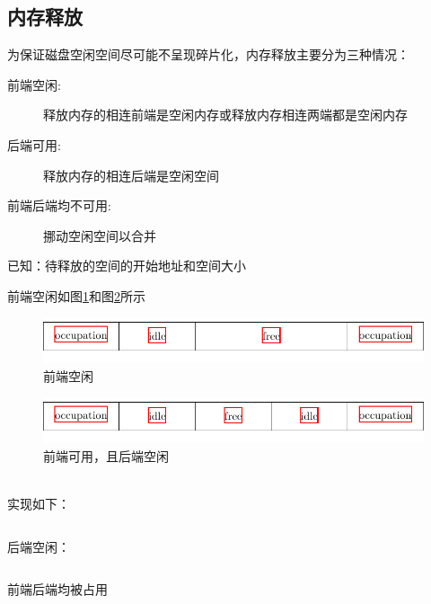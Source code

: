 \documentclass{swfcthesis}
\begin{document}
		\begin{listing}[H]
			\inputminted[tabsize=2, firstline=68, lastline=80,
			linenos=true]{c}{../ZOS/src/kernel/memory.c}
		\end{listing}
		
		\subsection{内存释放}
		为保证磁盘空闲空间尽可能不呈现碎片化，内存释放主要分为三种情况：
		\begin{description}
			\item[前端空闲:]释放内存的相连前端是空闲内存或释放内存相连两端都是空闲内存
			\item[后端可用:]释放内存的相连后端是空闲空间
			\item[前端后端均不可用:]挪动空闲空间以合并
		\end{description}

		已知：待释放的空间的开始地址和空间大小
		
		\newpage
		前端空闲如图\ref{fig:mem0}和图\ref{fig:mem1}所示\\
		\begin{figure}[h]
			\centering
			\includegraphics[width=.8\textwidth]{fig/mem0.pdf}
			\caption{前端空闲}
			\label{fig:mem0}
		\end{figure}
		\begin{figure}[h]
			\centering
			\includegraphics[width=.8\textwidth]{fig/mem1.pdf}
			\caption{前端可用，且后端空闲}
			\label{fig:mem1}
		\end{figure}
		\\实现如下：
		\begin{listing}[H]
		\inputminted[tabsize=2, firstline=98, lastline=116,
		linenos=true]{c}{../ZOS/src/kernel/memory.c}
		\end{listing}

		后端空闲：
		\begin{listing}[H]
		\inputminted[tabsize=2, firstline=118, lastline=127,
		linenos=true]{c}{../ZOS/src/kernel/memory.c}
		\end{listing}

		前端后端均被占用
		\begin{listing}[H]
		\inputminted[tabsize=2, firstline=128, lastline=141,
		linenos=true]{c}{../ZOS/src/kernel/memory.c}
		\end{listing}
\end{document}
